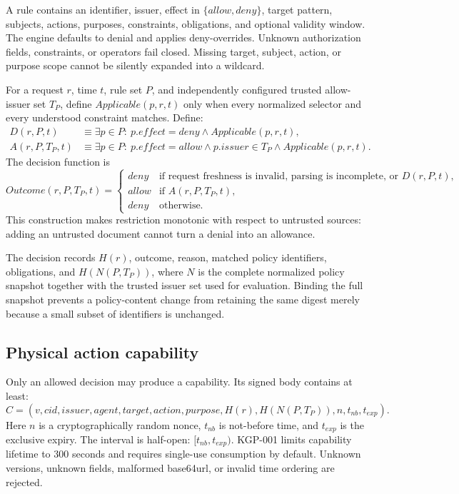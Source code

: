 \documentclass[10.5pt,a4paper]{article}
\begin{document}
A rule contains an identifier, issuer, effect in $\{allow,deny\}$, target pattern, subjects,
actions, purposes, constraints, obligations, and optional validity window. The engine defaults
to denial and applies deny-overrides. Unknown authorization fields, constraints, or operators
fail closed. Missing target, subject, action, or purpose scope cannot be silently expanded into
a wildcard.

For a request $r$, time $t$, rule set $P$, and independently configured trusted allow-issuer
set $T_P$, define $Applicable(p,r,t)$ only when every normalized selector and every understood
constraint matches. Define:
\begin{align*}
D(r,P,t) &\equiv \exists p\in P:\ p.effect=deny \land Applicable(p,r,t),\\
A(r,P,T_P,t) &\equiv \exists p\in P:\ p.effect=allow \land p.issuer\in T_P
                 \land Applicable(p,r,t).
\end{align*}
The decision function is
\[
Outcome(r,P,T_P,t)=
\begin{cases}
deny & \text{if request freshness is invalid, parsing is incomplete, or }D(r,P,t),\\
allow & \text{if }A(r,P,T_P,t),\\
deny & \text{otherwise.}
\end{cases}
\]
This construction makes restriction monotonic with respect to untrusted sources: adding an
untrusted document cannot turn a denial into an allowance.

The decision records $H(r)$, outcome, reason, matched policy identifiers, obligations, and
$H(N(P,T_P))$, where $N$ is the complete normalized policy snapshot together with the trusted
issuer set used for evaluation. Binding the full snapshot prevents a policy-content change from
retaining the same digest merely because a small subset of identifiers is unchanged.

\subsection{Physical action capability}

Only an allowed decision may produce a capability. Its signed body contains at least:
\[
C=(v,cid,issuer,agent,target,action,purpose,H(r),H(N(P,T_P)),n,t_{nb},t_{exp}).
\]
Here $n$ is a cryptographically random nonce, $t_{nb}$ is not-before time, and $t_{exp}$ is the
exclusive expiry. The interval is half-open: $[t_{nb},t_{exp})$. KGP-001 limits capability
lifetime to 300 seconds and requires single-use consumption by default. Unknown versions,
unknown fields, malformed base64url, or invalid time ordering are rejected.
\end{document}
